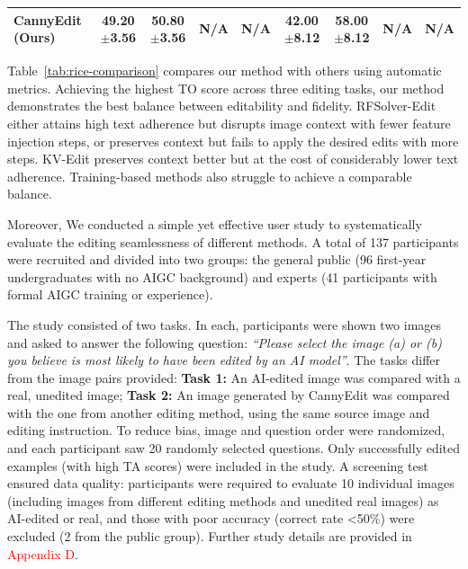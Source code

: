 \documentclass{article}
\begin{document}
\begin{table}[t]
\begin{center}
{\begin{tabular}{lcccccccc}
\midrule
\textbf{CannyEdit (Ours)} & \textbf{49.20}{\scriptsize $\pm${3.56}} & \textbf{50.80}{\scriptsize $\pm${3.56}} & N/A & N/A & \textbf{42.00}{\scriptsize $\pm${8.12}} & \textbf{58.00}{\scriptsize $\pm${8.12}} & N/A & N/A\\
\bottomrule
\end{tabular}}
\label{tab:rice-human-study} 
\end{center}
\end{table}

Table~\ref{tab:rice-comparison} compares our method with others using automatic metrics. Achieving the highest TO score across three editing tasks, our method demonstrates the best balance between editability and fidelity. RFSolver-Edit either attains high text adherence but disrupts image context with fewer feature injection steps, or preserves context but fails to apply the desired edits with more steps. KV-Edit preserves context better but at the cost of considerably lower text adherence. Training-based methods also struggle to achieve a comparable balance.

Moreover, We conducted a simple yet effective user study to systematically evaluate the editing seamlessness of different methods. A total of 137 participants were recruited and divided into two groups: the general public (96 first-year undergraduates with no AIGC background) and experts (41 participants with formal AIGC training or experience).

The study consisted of two tasks. In each, participants were shown two images and asked to answer the following question: \emph{``Please select the image (a) or (b) you believe is most likely to have been edited by an AI model''}. The tasks differ from the image pairs provided: \textbf{Task 1:} An AI-edited image was compared with a real, unedited image; \textbf{Task 2:} An image generated by CannyEdit was compared with the one from another editing method, using the same source image and editing instruction. To reduce bias, image and question order were randomized, and each participant saw 20 randomly selected questions. Only successfully edited examples (with high TA scores) were included in the study. A screening test ensured data quality: participants were required to evaluate 10 individual images (including images from different editing methods and unedited real images) as AI-edited or real, and those with poor accuracy (correct rate <50\%) were excluded (2 from the public group). Further study details are provided in \textcolor{red}{Appendix D}.
\end{document}
